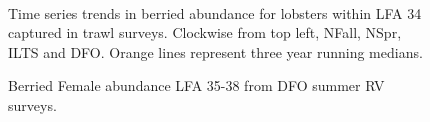 \documentclass[11pt]{article}
\newcommand{\e}{/SpinDr/backup/bio_data/bio.lobster/figures/LFA3438Framework2019/} %
\begin{document}
\begin{figure}
        \centering
    \\
                
        
         \caption{Time series trends in berried abundance for lobsters within LFA 34 captured in trawl surveys. Clockwise from top left, NFall, NSpr, ILTS and DFO.
         Orange lines represent three year running medians. }
        \end{figure}
   \begin{figure}
    \centering
        \caption{Berried Female abundance LFA 35-38 from DFO summer RV surveys.}

    \end{figure}
\end{document}
